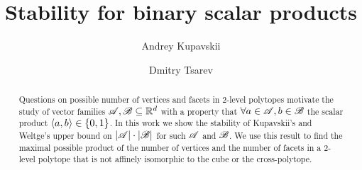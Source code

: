 

\title{\textbf{Stability for binary scalar products}}
\author[1]{Andrey Kupavskii}
\author[2]{Dmitry Tsarev}
\date{}



\maketitle

\begin{abstract}
    Questions on possible number of vertices and facets in 2-level polytopes motivate the study of vector families ${\mathscr{A}},{\mathscr{B}} \subseteq {\mathbb{R}}^d$ with a property that $\forall a \in {\mathscr{A}}, b \in {\mathscr{B}}$ the scalar product $\langle a, b\rangle \in\{0,1\}$. In this work we show the stability of Kupavskii's and Weltge's upper bound on $\left|{\mathscr{A}}\right|\cdot\left|{\mathscr{B}}\right|$ for such ${\mathscr{A}}$ and ${\mathscr{B}}$. We use this result to find the maximal possible product of the number of vertices and the number of facets in a 2-level polytope that is not affinely isomorphic to the cube or the cross-polytope.
\end{abstract}








\nocite{*}



